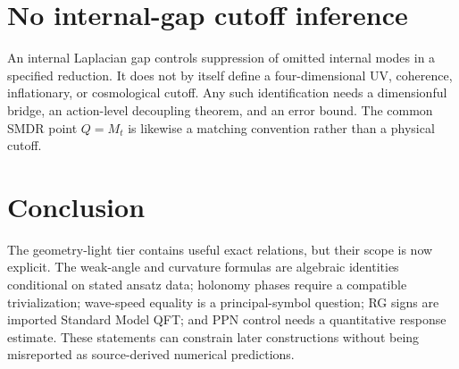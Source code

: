 \documentclass[11pt]{article}
\begin{document}
\section{No internal-gap cutoff inference}

An internal Laplacian gap controls suppression of omitted internal modes in a
specified reduction. It does not by itself define a four-dimensional UV,
coherence, inflationary, or cosmological cutoff. Any such identification needs
a dimensionful bridge, an action-level decoupling theorem, and an error bound.
The common SMDR point $Q=M_t$ is likewise a matching convention rather than a
physical cutoff.

\section{Conclusion}

The geometry-light tier contains useful exact relations, but their scope is
now explicit. The weak-angle and curvature formulas are algebraic identities
conditional on stated ansatz data; holonomy phases require a compatible
trivialization; wave-speed equality is a principal-symbol question; RG signs
are imported Standard Model QFT; and PPN control needs a quantitative response
estimate. These statements can constrain later constructions without being
misreported as source-derived numerical predictions.
\end{document}
